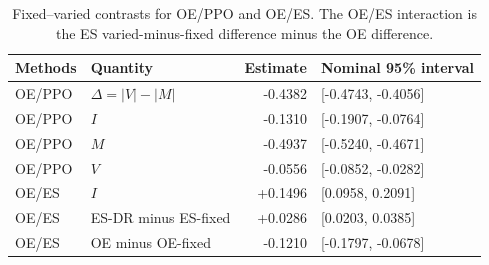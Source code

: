 \begin{table}[tb]
\centering\small
\caption{Fixed--varied contrasts for OE/PPO and OE/ES. The OE/ES interaction is the ES varied-minus-fixed difference minus the OE difference.}\label{tab:four}
\begin{tabularx}{\linewidth}{lP{4.5cm}rY}
\toprule
Methods & Quantity & Estimate & Nominal 95\% interval\\\midrule
OE/PPO & $\Delta=|V|-|M|$ & -0.4382 & [-0.4743, -0.4056]\\
OE/PPO & $I$ & -0.1310 & [-0.1907, -0.0764]\\
OE/PPO & $M$ & -0.4937 & [-0.5240, -0.4671]\\
OE/PPO & $V$ & -0.0556 & [-0.0852, -0.0282]\\
OE/ES & $I$ & +0.1496 & [0.0958, 0.2091]\\
OE/ES & ES-DR minus ES-fixed & +0.0286 & [0.0203, 0.0385]\\
OE/ES & OE minus OE-fixed & -0.1210 & [-0.1797, -0.0678]\\
\bottomrule
\end{tabularx}
\end{table}
